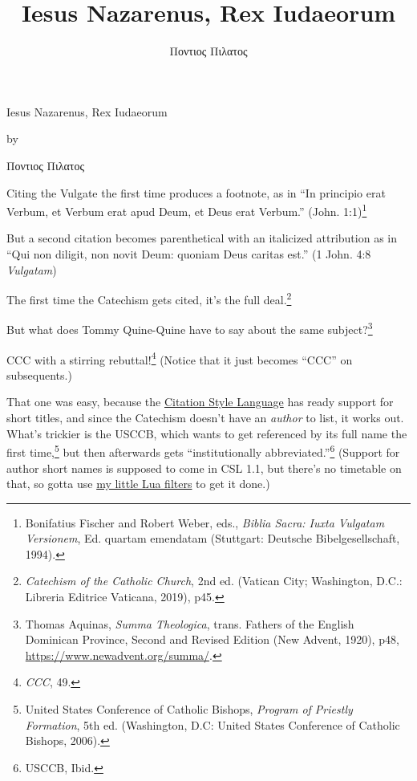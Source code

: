 \documentclass[
    12pt,
    letterpaper,
    oneside,
    noraggedright
]{turabian-researchpaper}
\title{{Iesus Nazarenus, Rex Iudaeorum}}
\author{{Ποντιος Πιλατος}}
\begin{document}
    \begin{center}

    \thispagestyle{empty}
    \vspace*{1in}
    \begin{singlespace}
        {Iesus Nazarenus, Rex Iudaeorum}
        \end{singlespace}
    \vspace{2in - \baselineskip}

    by
    \vspace{2in - \baselineskip}

    {Ποντιος Πιλατος}

    \vspace{2in - \baselineskip}

    \end{center}
    \newpage
    \setcounter{page}{1}

Citing the Vulgate the first time produces a footnote, as in ``In
principio erat Verbum, et Verbum erat apud Deum, et Deus erat Verbum.''
{(John. 1:1)\footnote{Bonifatius Fischer and Robert Weber, eds.,
  \emph{Biblia Sacra: Iuxta Vulgatam Versionem}, Ed. quartam emendatam
  (Stuttgart: Deutsche Bibelgesellschaft, 1994).}}

But a second citation becomes parenthetical with an italicized
attribution as in ``Qui non diligit, non novit Deum: quoniam Deus
caritas est.'' {(1 John. 4:8{ \emph{Vulgatam}})}

The first time the Catechism gets cited, it's the full deal.\footnote{\emph{Catechism
  of the Catholic Church}, 2nd ed. (Vatican City; Washington, D.C.:
  Libreria Editrice Vaticana, 2019), p45.}

But what does Tommy Quine-Quine have to say about the same
subject?\footnote{Thomas Aquinas, \emph{Summa Theologica}, trans.
  Fathers of the English Dominican Province, Second and Revised Edition
  (New Advent, 1920), p48, \url{https://www.newadvent.org/summa/}.}

CCC with a stirring rebuttal!\footnote{\emph{CCC}, 49.} (Notice that it
just becomes ``CCC'' on subsequents.)

That one was easy, because the
\href{https://citationstyles.org/}{Citation Style Language} has ready
support for short titles, and since the Catechism doesn't have an
\emph{author} to list, it works out. What's trickier is the USCCB, which
wants to get referenced by its full name the first time,\footnote{United
  States Conference of Catholic Bishops, \emph{Program of Priestly
  Formation}, 5th ed. (Washington, D.C: United States Conference of
  Catholic Bishops, 2006).} but then afterwards gets ``institutionally
abbreviated.''\footnote{USCCB, Ibid.} (Support for author short names is
supposed to come in CSL 1.1, but there's no timetable on that, so gotta
use
\href{https://github.com/sjml/paper/tree/main/paper/resources/project_template/.paper_resources/filters}{my
little Lua filters} to get it done.)
\end{document}
